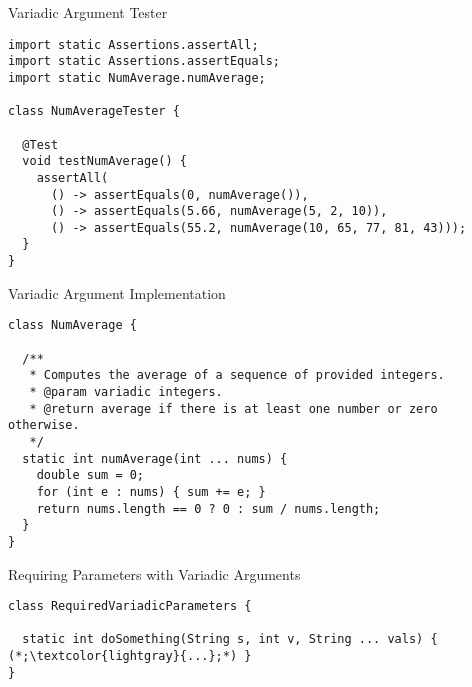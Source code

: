 \begin{cl}[]{Variadic Argument  Tester}
\begin{lstlisting}[language=MyJava]
import static Assertions.assertAll;
import static Assertions.assertEquals;
import static NumAverage.numAverage;

class NumAverageTester {

  @Test
  void testNumAverage() {
    assertAll(
      () -> assertEquals(0, numAverage()),
      () -> assertEquals(5.66, numAverage(5, 2, 10)),
      () -> assertEquals(55.2, numAverage(10, 65, 77, 81, 43)));
  }
}
\end{lstlisting}
\end{cl}

\begin{cl}[]{Variadic Argument  Implementation}
\begin{lstlisting}[language=MyJava]
class NumAverage {

  /**
   * Computes the average of a sequence of provided integers.
   * @param variadic integers.
   * @return average if there is at least one number or zero otherwise.
   */
  static int numAverage(int ... nums) {
    double sum = 0;
    for (int e : nums) { sum += e; }
    return nums.length == 0 ? 0 : sum / nums.length;
  }
}
\end{lstlisting}
\end{cl}


\begin{cl}[]{Requiring Parameters with Variadic Arguments}
\begin{lstlisting}[language=MyJava]
class RequiredVariadicParameters {

  static int doSomething(String s, int v, String ... vals) { (*;\textcolor{lightgray}{...};*) }
}
\end{lstlisting}
\end{cl}


